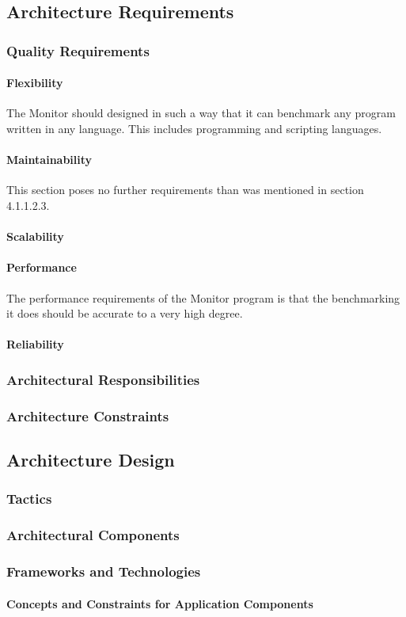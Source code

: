 
\subsection{Architecture Requirements}


\subsubsection{Quality Requirements}
\paragraph{Flexibility}
The Monitor should designed in such a way that it can benchmark any program
written in any language. This includes programming and scripting languages.

\paragraph{Maintainability}
This section poses no further requirements than was mentioned in
section 4.1.1.2.3.

\paragraph{Scalability}


\paragraph{Performance}
The performance requirements of the Monitor program is that the benchmarking
it does should be accurate to a very high degree.

\paragraph{Reliability}


\subsubsection{Architectural Responsibilities}


\subsubsection{Architecture Constraints}


\subsection{Architecture Design}
\subsubsection{Tactics}

\subsubsection{Architectural Components}

\subsubsection{Frameworks and Technologies}

\paragraph{Concepts and Constraints for Application Components}
